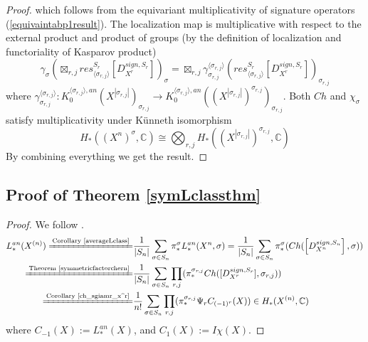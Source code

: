 \documentclass[11pt,leqno,twoside]{amsart}
\theoremstyle{plainsl}
\theoremstyle{definition}
\begin{document}
\begin{proof}
which follows from the equivariant multiplicativity  of signature operators (\ref{equivaintabp1result}).
  The localization map is multiplicative with respect to the external product and product of groups (by the definition of localization and functoriality of Kasparov product)
\[\gamma_{\sigma}\left(\boxtimes_{r,j} res_{\langle  \sigma_{r,j}\rangle}^{S_r} [D^{sign,S_r}_{X^r}]\right)_{\sigma}=\boxtimes_{r,j} \gamma^{\langle \sigma_{r,j} \rangle}_{{\sigma_{r,j}}}(res_{\langle  \sigma_{r,j}\rangle}^{S_r} [D^{sign,S_r}_{X^r}])_{\sigma_{r,j}}\]
where $\gamma^{\langle \sigma_{r,j} \rangle}_{{\sigma_{r,j}}}:K_0^{\langle  \sigma_{r,j}\rangle,an}(X^{|\sigma_{r,j}|})_{\sigma_{r,j}} \rightarrow K_0^{\langle  \sigma_{r,j}\rangle,an}((X^{|\sigma_{r,j}|})^{\sigma_{r,j}})_{\sigma_{r,j}}$.
 Both $Ch$ and $\chi_{\sigma}$ satisfy multiplicativity under  K\"unneth isomorphism
\[H_*((X^n)^{\sigma},\mathbb{C}) \cong \bigotimes_{r,j} H_*((X^{|\sigma_{r,j}|})^{\sigma_{r,j}},\mathbb{C})\]
By combining everything we get the result.
\end{proof}





\subsection{Proof of Theorem \ref{symLclassthm}}
\begin{proof}
We follow \cite{CMSSY}. 
\begin{align*}
    L^{an}_*(X^{(n)}) \xlongequal{\text{Corollary~\ref{averageLclass}}} &
    \frac{1}{|S_n|}\sum_{\sigma\in S_n} \pi^{\sigma}_* L^{an}_*(X^n,\sigma)=\frac{1}{|S_n|}\sum_{\sigma\in S_n} \pi^{\sigma}_*(Ch(\left[D^{sign,S_n}_{X^n}\right],\sigma))\\
    \xlongequal{\text{Theorem~\ref{symmetricfactorchern}}} & 
    \frac{1}{|S_n|}\sum_{\sigma\in S_n}  \prod_{r,j}(\pi^{\sigma_{r,j}}_* Ch([D^{sign,S_r}_{X^r}],\sigma_{r,j}))\\
\xlongequal{\text{Corollary~\ref{ch_sgiamr_x^r}}} & 
    \frac{1}{n!}\sum_{\sigma\in S_n}  \prod_{r,j} (\pi^{\sigma_{r,j}}_*\Psi_r C_{(-1)^r}(X)) \in H_*(X^{(n)},\mathbb{C})
\end{align*}
where $C_{-1}(X):=L_*^{an}(X)$, and $C_{1}(X):=I\chi(X)$.
\end{proof}
\end{document}
